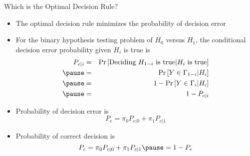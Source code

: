 \documentclass[t]{beamer}
\begin{document}
\begin{frame}{Which is the Optimal Decision Rule?}
  \footnotesize
  \begin{itemize}
    \item The optimal decision rule minimizes the probability of decision error
    \pause
    \item For the binary hypothesis testing problem of $H_0$ versus $H_1$, the conditional decision error probability given $H_i$ is true is
      \begin{eqnarray*}
        P_{e|i}  & = & \Pr\left[ \text{Deciding $H_{1-i}$ is true} \lvert \text{$H_i$ is true} \right] \\
                 \pause
                 & = & \Pr\left[ Y \in \Gamma_{1-i} \lvert H_i\right] \\
                 \pause
                 & = & 1 - \Pr\left[ Y \in \Gamma_{i} \lvert H_i\right] \\
                 \pause
                 & = & 1 - P_{c|i}
      \end{eqnarray*}
    \item \pause Probability of decision error is
      \begin{equation*}
        P_{e}   =  \pi_0 P_{e|0} + \pi_1 P_{e|1} 
      \end{equation*}
    \item \pause Probability of correct decision is
      \begin{equation*}
        P_{c}   =  \pi_0 P_{c|0} + \pi_1 P_{c|1}  \pause = 1-P_e
      \end{equation*}
  \end{itemize}
  \normalsize
\end{frame}
\end{document}

